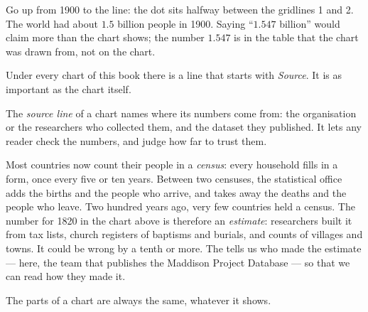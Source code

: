\begin{example}\label{ex:g6:reading-economic-charts:1900}
Go up from 1900 to the line: the dot sits halfway between the gridlines 1 and
2. The world had about $1.5$ billion people in 1900. Saying ``$1.547$ billion''
would claim more than the chart shows; the number $1.547$ is in the table that
the chart was drawn from, not on the chart.
\end{example}

Under every chart of this book there is a line that starts with
\emph{Source}. It is as important as the chart itself.

\begin{definition}\label{def:g6:reading-economic-charts:source-line}
The \emph{source line} of a chart names where its numbers
come from: the organisation or the researchers who collected them, and the
dataset they published. It lets any reader check the numbers, and judge how
far to trust them.
\end{definition}

\begin{measure}
Most countries now count their people in a \emph{census}: every household
fills in a form, once every five or ten years. Between two censuses, the
statistical office adds the births and the people who arrive, and takes away
the deaths and the people who leave. Two hundred years ago, very few countries
held a census. The number for 1820 in the chart above is therefore an
\emph{estimate}: researchers built it from tax lists, church registers of
baptisms and burials, and counts of villages and towns. It could be wrong by
a tenth or more. The  tells us who made the estimate --- here, the
team that publishes the Maddison Project Database --- so that we can read how
they made it.
\end{measure}

The parts of a chart are always the same, whatever it shows.

